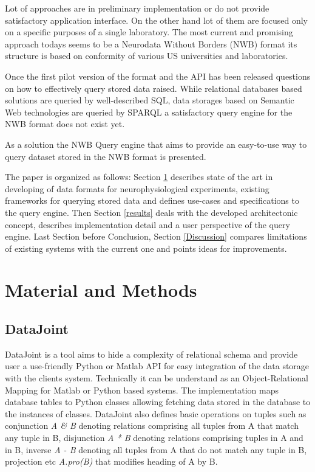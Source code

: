\documentclass[utf8]{frontiersSCNS} %
\begin{document}
Lot of approaches are in preliminary implementation or do not provide satisfactory application interface. On the other hand lot of them are focused only on a specific purposes of a single laboratory. The most current and promising approach todays seems to be a Neurodata Without Borders (NWB) format its structure is based on conformity of various US universities and laboratories.

Once the first pilot version of the format and the API has been released \citep{teeters-neuron} questions on how to effectively query stored data raised. While relational databases based solutions are queried by well-described SQL, data storages based on Semantic Web technologies are queried by SPARQL \citep{prudhommeaux2008sparql} a satisfactory query engine for the NWB format does not exist yet.

As a solution the NWB Query engine that aims to provide an easy-to-use way to query dataset stored in the NWB format is presented.

The paper is organized as follows: Section \ref{materials_and_methods} describes state of the art in developing of data formats for neurophysiological experiments, existing frameworks for querying stored data and defines use-cases and specifications to the query engine. Then Section \ref{results} deals with the developed architectonic concept, describes implementation detail and a user perspective of the query engine. Last Section before Conclusion, Section \ref{Discussion} compares limitations of existing systems with the current one and points ideas for improvements.


\section{Material and Methods}
\label{materials_and_methods}

\subsection{DataJoint}
\label{DataJoint}

DataJoint \citep{Yatsenko031658} is a tool aims to hide a complexity of relational schema and provide user a use-friendly Python or Matlab API for easy integration of the data storage with the clients system. Technically it can be understand as an Object-Relational Mapping \citep{Keith2010} for Matlab or Python based systems. The implementation maps database tables to Python classes allowing fetching data stored in the database to the instances of classes. DataJoint also defines basic operations on tuples such as conjunction \emph{A \& B} denoting relations comprising all tuples from A that match any tuple in B, disjunction \emph{A * B} denoting relations comprising tuples in A and in B, inverse \emph{A - B} denoting all tuples from A that do not match any tuple in B, projection etc \emph{A.pro(B)} that modifies heading of A by B.
\end{document}
